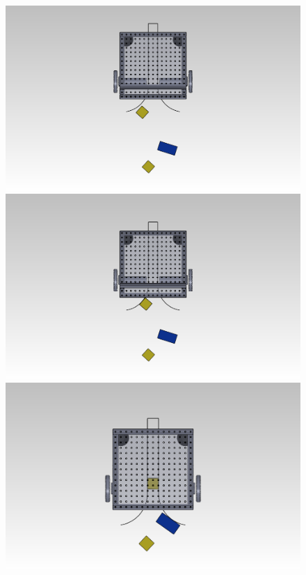 \documentclass[letterpaper,11pt]{article}
\begin{document}
\newlength{\demowidth}
\setlength{\demowidth}{2.13in}
\newlength{\demotextwidth}
\setlength{\demotextwidth}{\demowidth}
\addtolength{\demotextwidth}{-0.15in}
\begin{figure}[h]
 \centering
  \includegraphics[width=\demowidth]{images/Demo01}
  \includegraphics[width=\demowidth]{images/Demo02}
  \includegraphics[width=\demowidth]{images/Demo03} \\

\end{figure}
\end{document}
